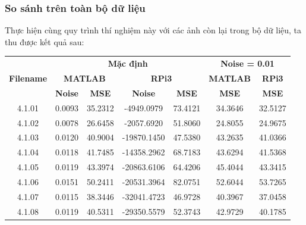 \subsubsection{So sánh trên toàn bộ dữ liệu}

Thực hiện cùng quy trình thí nghiệm này với các ảnh còn lại trong bộ dữ liệu, ta thu được kết quả sau:

\begin{table}[H]
\centering
\begin{tabular}{|c|cccc|cc|}
\hline
\multirow{3}{*}{\textbf{Filename}} & \multicolumn{4}{c|}{\textbf{Mặc định}} & \multicolumn{2}{c|}{\textbf{Noise = 0.01}} \\ \cline{2-7} 
 & \multicolumn{2}{c|}{\textbf{MATLAB}} & \multicolumn{2}{c|}{\textbf{RPi3}} & \multicolumn{1}{c|}{\textbf{MATLAB}} & \textbf{RPi3} \\ \cline{2-7} 
 & \multicolumn{1}{c|}{\textbf{Noise}} & \multicolumn{1}{c|}{\textbf{MSE}} & \multicolumn{1}{c|}{\textbf{Noise}} & \textbf{MSE} & \multicolumn{1}{c|}{\textbf{MSE}} & \textbf{MSE} \\ \hline
4.1.01 & \multicolumn{1}{c|}{0.0093} & \multicolumn{1}{c|}{35.2312} & \multicolumn{1}{c|}{-4949.0979} & 73.4121 & \multicolumn{1}{c|}{34.3646} & 32.5127 \\ \hline
4.1.02 & \multicolumn{1}{c|}{0.0078} & \multicolumn{1}{c|}{26.6458} & \multicolumn{1}{c|}{-2057.6920} & 51.8060 & \multicolumn{1}{c|}{24.8055} & 24.9675 \\ \hline
4.1.03 & \multicolumn{1}{c|}{0.0120} & \multicolumn{1}{c|}{40.9004} & \multicolumn{1}{c|}{-19870.1450} & 47.5380 & \multicolumn{1}{c|}{43.2635} & 41.0366 \\ \hline
4.1.04 & \multicolumn{1}{c|}{0.0118} & \multicolumn{1}{c|}{41.7485} & \multicolumn{1}{c|}{-14358.2962} & 68.7183 & \multicolumn{1}{c|}{43.6294} & 41.5368 \\ \hline
4.1.05 & \multicolumn{1}{c|}{0.0119} & \multicolumn{1}{c|}{43.3974} & \multicolumn{1}{c|}{-20863.6106} & 64.4206 & \multicolumn{1}{c|}{45.4044} & 43.3415 \\ \hline
4.1.06 & \multicolumn{1}{c|}{0.0151} & \multicolumn{1}{c|}{50.2411} & \multicolumn{1}{c|}{-20531.3964} & 82.0751 & \multicolumn{1}{c|}{52.6044} & 53.7265 \\ \hline
4.1.07 & \multicolumn{1}{c|}{0.0115} & \multicolumn{1}{c|}{38.3446} & \multicolumn{1}{c|}{-32041.4723} & 46.9728 & \multicolumn{1}{c|}{40.3967} & 37.0458 \\ \hline
4.1.08 & \multicolumn{1}{c|}{0.0119} & \multicolumn{1}{c|}{40.5311} & \multicolumn{1}{c|}{-29350.5579} & 52.3743 & \multicolumn{1}{c|}{42.9729} & 40.1785 \\ \hline

\end{tabular}
\end{table}
